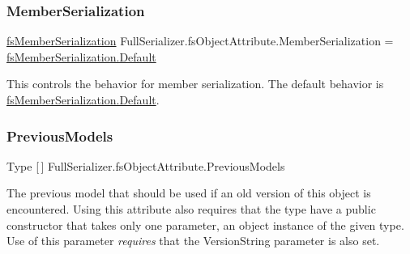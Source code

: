 \mbox{\label{class_full_serializer_1_1fs_object_attribute_afcdb79992b507e9e9c04111c6a9edadc}} 
\subsubsection{\texorpdfstring{Member\+Serialization}{MemberSerialization}}
{\footnotesize\ttfamily \hyperlink{namespace_full_serializer_ad0dc98cd54a3d07f8c579d82585906f8}{fs\+Member\+Serialization} Full\+Serializer.\+fs\+Object\+Attribute.\+Member\+Serialization = \hyperlink{namespace_full_serializer_ad0dc98cd54a3d07f8c579d82585906f8a7a1920d61156abc05a60135aefe8bc67}{fs\+Member\+Serialization.\+Default}}



This controls the behavior for member serialization. The default behavior is \hyperlink{namespace_full_serializer_ad0dc98cd54a3d07f8c579d82585906f8a7a1920d61156abc05a60135aefe8bc67}{fs\+Member\+Serialization.\+Default}. 

\mbox{\label{class_full_serializer_1_1fs_object_attribute_ae82b6c5b9d90688cfa0ff8ecc5b53c9c}} 
\subsubsection{\texorpdfstring{Previous\+Models}{PreviousModels}}
{\footnotesize\ttfamily Type \mbox{[}$\,$\mbox{]} Full\+Serializer.\+fs\+Object\+Attribute.\+Previous\+Models}



The previous model that should be used if an old version of this object is encountered. Using this attribute also requires that the type have a public constructor that takes only one parameter, an object instance of the given type. Use of this parameter {\itshape requires} that the Version\+String parameter is also set. 

